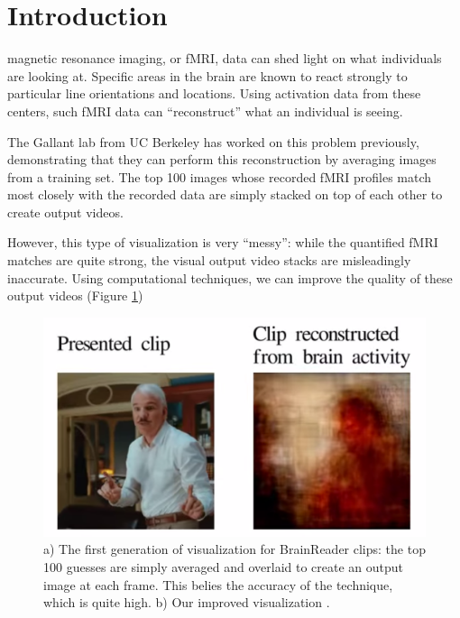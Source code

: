 
\section{Introduction}
 magnetic resonance imaging, or fMRI, data can shed light on what individuals are looking at.  Specific areas in the brain are known to react strongly to particular line orientations and locations.  Using activation data from these centers, such fMRI data can ``reconstruct'' what an individual is seeing.

The Gallant lab from UC Berkeley has worked on this problem previously, demonstrating  that they can perform this reconstruction by averaging images from a training set.  The top 100 images whose recorded fMRI profiles match most closely with the recorded data are simply stacked on top of each other to create output videos.

However, this type of visualization is very ``messy'': while the quantified fMRI matches are quite strong, the visual output video stacks are misleadingly inaccurate.  Using computational techniques, we can improve the quality of these output videos (Figure \ref{fig:avg})


\begin{figure}[t]
\centering
    \includegraphics[width=1.0\columnwidth]{figures/average.png}
\caption{a) The first generation of visualization for BrainReader clips: the top 100 guesses are simply averaged and overlaid to create an output image at each frame.  This belies the accuracy of the technique, which is quite high. b) Our improved visualization .}
\label{fig:avg}
\end{figure}


